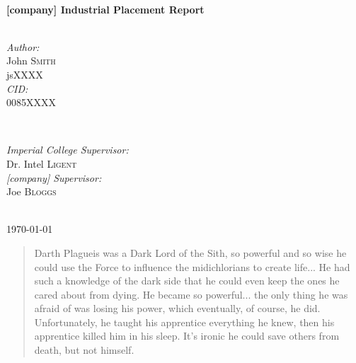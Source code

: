 \documentclass[12pt]{article}
\begin{document}
\begin{titlepage}

\HRule \\[0.4cm]
{ \huge \bfseries [company] Industrial Placement Report}\\[0.4cm] %
\HRule \\[1cm]
 

\begin{minipage}{0.4\textwidth}
\begin{flushleft} \large
\emph{Author:}\\
John \textsc{Smith} \\ %
jsXXXX \\ [0.5cm]
\emph{CID:}\\
0085XXXX
\end{flushleft}
\end{minipage}
~
\begin{minipage}{0.5\textwidth}
\begin{flushright} \large
\emph{Imperial College Supervisor:} \\
Dr. Intel \textsc{Ligent} \\[0.5cm] %
\emph{[company] Supervisor:} \\
Joe \textsc{Bloggs} %
\end{flushright}
\end{minipage}\\[1cm]


{\large \today}\\[0.5cm] %


\vfill %

\end{titlepage}

\renewcommand{\abstractname}{Summary}
\begin{abstract}
Darth Plagueis was a Dark Lord of the Sith, so powerful and so wise he could use the Force to influence the midichlorians to create life... He had such a knowledge of the dark side that he could even keep the ones he cared about from dying. He became so powerful... the only thing he was afraid of was losing his power, which eventually, of course, he did. Unfortunately, he taught his apprentice everything he knew, then his apprentice killed him in his sleep. It's ironic he could save others from death, but not himself.
\end{abstract}
\end{document}
